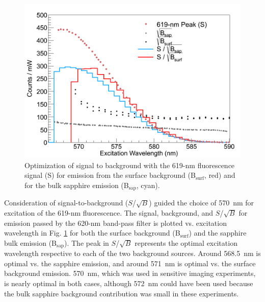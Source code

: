\begin{figure} %
        \centering
                \includegraphics[width=.7\textwidth]{figures/S_to_B_both.png}
                \caption{Optimization of signal to background with the 619-nm fluorescence signal (S) for emission from the surface background (B$_{\text{surf}}$, red) and for the bulk sapphire emission (B$_{\text{sap}}$, cyan).}
        \label{fig:StoB}
\end{figure}

Consideration of signal-to-background ($S$/$\sqrt{B}$) guided the choice of 570~nm for excitation of the 619-nm fluorescence.  The signal, background, and $S$/$\sqrt{B}$ for emission passed by the 620-nm band-pass filter is plotted vs. excitation wavelength in Fig. \ref{fig:StoB} for both the surface background (B$_{\text{surf}}$) and the sapphire bulk emission (B$_{\text{sap}}$).  The peak in $S$/$\sqrt{B}$ represents the optimal excitation wavelength respective to each of the two background sources.  Around 568.5~nm is optimal vs. the sapphire emission, and around 571~nm is optimal vs. the surface background emission. 570~nm, which was used in sensitive imaging experiments, is nearly optimal in both cases, although 572~nm could have been used because the bulk sapphire background contribution was small in these experiments.




